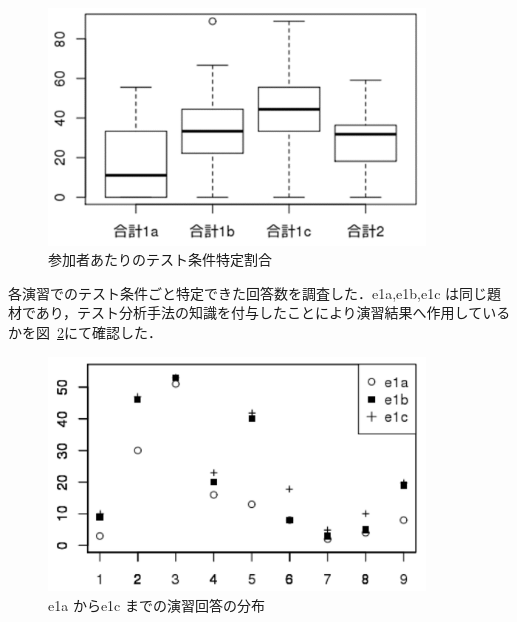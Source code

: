\documentclass[a4paper,11pt]{jreport}
\begin{document}
\begin{figure}[h]
  \begin{center}
  \includegraphics[width=10cm]{./image/D-3-Fig11.png}
  \caption{参加者あたりのテスト条件特定割合}
  \label{fig:D-3-Fig11}
  \end{center}
   \end{figure}


各演習でのテスト条件ごと特定できた回答数を調査した．e1a,e1b,e1c は同じ題材であり，テスト分析手法の知識を付与したことにより演習結果へ作用しているかを図~\ref{fig:D-3-Fig12}にて確認した．
\begin{figure}[h]
  \begin{center}
  \includegraphics[width=10cm]{./image/D-3-Fig12.png}
  \caption{e1a からe1c までの演習回答の分布}
  \label{fig:D-3-Fig12}
  \end{center}
   \end{figure}
\end{document}
